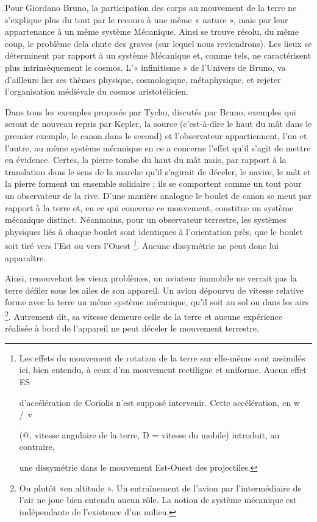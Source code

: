 Pour Giordano Bruno, la participation des corps au mouvement de
la terre ne s’explique plus du tout par le recours à une même « nature »,
mais par leur appartenance à un même système Mécanique. Ainsi se
trouve résolu, du même coup, le problème dela chute des graves (sur lequel
nous reviendrons). Les lieux se déterminent par rapport à un système
Mécanique et, comme tels, ne caractérisent plus intrinsèquement le
cosmos. L’« infinitisme » de l'Univers de Bruno, va d’ailleurs lier ses
thèmes physique, cosmologique, métaphysique, et rejeter l’organisation
médiévale du cosmos aristotélicien.

Dans tous les exemples proposés par Tycho, discutés par Bruno,
exemples qui seront de nouveau repris par Kepler, la source (c’est-à-dire
le haut du mât dans le premier exemple, le canon dans le second) et
l'observateur appartiennent, l’un et l’autre, au même système mécanique
en ce a concerne l’effet qu’il s’agit de mettre en évidence. Certes, la
pierre tombe du haut du mât mais, par rapport à la translation dans le
sens de la marche qu’il s’agirait de déceler, le navire, le mât et la pierre
forment un ensemble solidaire ; ils se comportent comme un tout pour un
observateur de la rive. D’une manière analogue le boulet de canon se
meut par rapport à la terre et, en ce qui concerne ce mouvement, constitue
un système mécanique distinct. Néanmoins, pour un observateur
terrestre, les systèmes physiques liés à chaque boulet sont identiques à
l'orientation près, que le boulet soit tiré vers l’Est ou vers l’Ouest \footnote{Les effets du mouvement de rotation de la terre sur elle-même sont assimilés
ici, bien entendu, à ceux d’un mouvement rectiligne et uniforme. Aucun effet
ES 

d’accélération de Coriolis n’est supposé intervenir. Cette accélération, en w /\ v

(@, vitesse angulaire de la terre, D = vitesse du mobile) introduit, au contraire,

une dissymétrie dans le mouvement Est-Ouest des projectiles.}.
Aucune dissymétrie ne peut donc lui apparaître.

Ainsi, renouvelant les vieux problèmes, un aviateur immobile ne
verrait pas la terre défiler sous les ailes de son appareil. Un avion dépourvu
de vitesse relative forme avec la terre un même système mécanique, qu’il
soit au sol ou dans les airs \footnote{Ou plutôt «en altitude ». Un entraînement de l’avion par l’intermédiaire
de l’air ne joue bien entendu aucun rôle. La notion de système mécanique est indépendante
de l’existence d’un milieu.}. Autrement dit, sa vitesse demeure celle
de la terre et aucune expérience réalisée à bord de l’appareil ne peut
déceler le mouvement terrestre.

